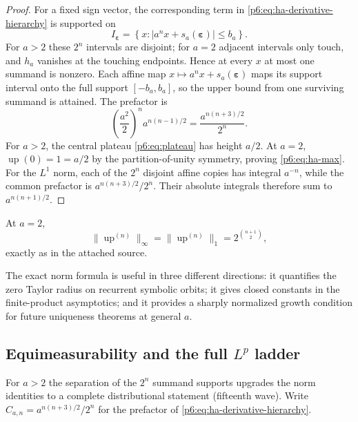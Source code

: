 \documentclass[11pt,oneside]{article}
\numberwithin{equation}{section}
\theoremstyle{definition}
\theoremstyle{remark}
\newcommand{\Up}{\operatorname{up}}
\begin{document}
\begin{proof}
For a fixed sign vector, the corresponding term in
\eqref{p6:eq:ha-derivative-hierarchy} is supported on
\[
 I_{\boldsymbol\varepsilon}
 =\left\{x:\left|a^nx+s_a(\boldsymbol\varepsilon)\right|\le b_a\right\}.
\]
For $a>2$ these $2^n$ intervals are disjoint; for $a=2$ adjacent intervals only
touch, and $h_a$ vanishes at the touching endpoints.  Hence at every $x$ at
most one summand is nonzero.  Each affine map
$x\mapsto a^nx+s_a(\boldsymbol\varepsilon)$ maps its support interval onto the
full support $[-b_a,b_a]$, so the upper bound from one surviving summand is
attained.  The prefactor is
\[
 \left(\frac{a^2}{2}\right)^na^{n(n-1)/2}
 =\frac{a^{n(n+3)/2}}{2^n}.
\]
For $a>2$, the central plateau \eqref{p6:eq:plateau} has height $a/2$.  At $a=2$,
$\Up(0)=1=a/2$ by the partition-of-unity symmetry, proving
\eqref{p6:eq:ha-max}.  For the $L^1$ norm, each of the $2^n$ disjoint affine copies
has integral $a^{-n}$, while the common prefactor is
$a^{n(n+3)/2}/2^n$.  Their absolute integrals therefore sum to
$a^{n(n+1)/2}$.
\end{proof}

\begin{corollary}
At $a=2$,
\[
 \|\Up^{(n)}\|_\infty
 =\|\Up^{(n)}\|_1
 =2^{\binom{n+1}{2}},
\]
exactly as in the attached source.
\end{corollary}

\begin{novelbox}
The exact norm formula is useful in three different directions: it quantifies
the zero Taylor radius on recurrent symbolic orbits; it gives closed constants
in the finite-product asymptotics; and it provides a sharply normalized growth
condition for future uniqueness theorems at general $a$.
\end{novelbox}

\subsection{Equimeasurability and the full \texorpdfstring{$L^p$}{Lp} ladder}

For $a>2$ the separation of the $2^n$ summand supports upgrades the norm
identities to a complete distributional statement (fifteenth wave).  Write
$C_{a,n}=a^{n(n+3)/2}/2^n$ for the prefactor of
\eqref{p6:eq:ha-derivative-hierarchy}.
\end{document}
